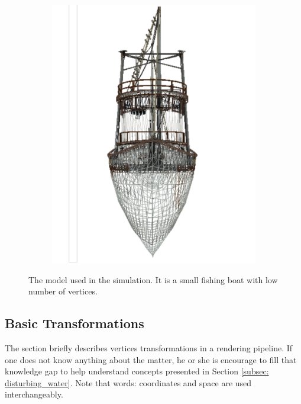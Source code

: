 \documentclass{report}
\begin{document}
\begin{figure}[H]
\begin{subfigure}{.25\textwidth}
  \includegraphics[width=.8\linewidth]{images/ship_sketch_3.pdf}
  \label{fig:ship_sketch_3}
\end{subfigure}
\caption{The model used in the simulation. It is a small fishing boat with low number of vertices.}
\label{fig:ship_obj}
\end{figure}

\subsection{Basic Transformations} \label{subsec:basic_transform}
The section briefly describes vertices transformations in a rendering pipeline. If one does not know anything about the matter, he or she is encourage to fill that knowledge gap to help understand concepts presented in Section \ref{subsec: disturbing_water}. Note that words: coordinates and space are used interchangeably. 
\end{document}
